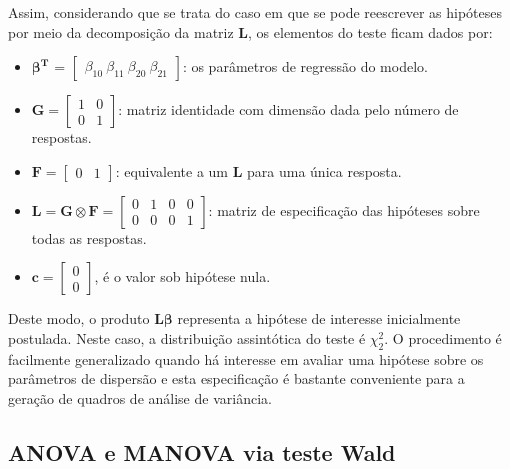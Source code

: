 \documentclass[AMA,STIX1COL]{WileyNJD-v2}
\begin{document}
Assim, considerando que se trata do caso em que se pode reescrever as hipóteses por meio da decomposição da matriz $\boldsymbol{L}$, os elementos do teste ficam dados por:

\begin{itemize}
  
  \item $\boldsymbol{\beta^{T}}$ = $\begin{bmatrix} \beta_{10} \  \beta_{11} \  \beta_{20} \  \beta_{21} \end{bmatrix}$: os parâmetros de regressão do modelo.


\item $\boldsymbol{G} = \begin{bmatrix} 1 & 0 \\ 0 & 1  \end{bmatrix}$: matriz identidade com dimensão dada pelo número de respostas.

\item $\boldsymbol{F} = \begin{bmatrix} 0 & 1 \end{bmatrix}$: equivalente a um $\boldsymbol{L}$ para uma única resposta.

\item $\boldsymbol{L} = \boldsymbol{G} \otimes \boldsymbol{F} =  \begin{bmatrix} 0 & 1 & 0 & 0 \\
0 & 0 & 0 & 1 \end{bmatrix}$: matriz de especificação das hipóteses sobre todas as respostas.
 
\item $\boldsymbol{c} = \begin{bmatrix} 0 \\ 0 \end{bmatrix}$, é o valor sob hipótese nula. 

\end{itemize}

Deste modo, o produto $\boldsymbol{L}\boldsymbol{\beta}$ representa a hipótese de interesse inicialmente postulada. Neste caso, a distribuição assintótica do teste é $\chi^2_2$. O procedimento é facilmente generalizado quando há interesse em avaliar uma hipótese sobre os parâmetros de dispersão e esta especificação é bastante conveniente para a geração de quadros de análise de variância.

\subsection{ANOVA e MANOVA via teste Wald}
\end{document}
